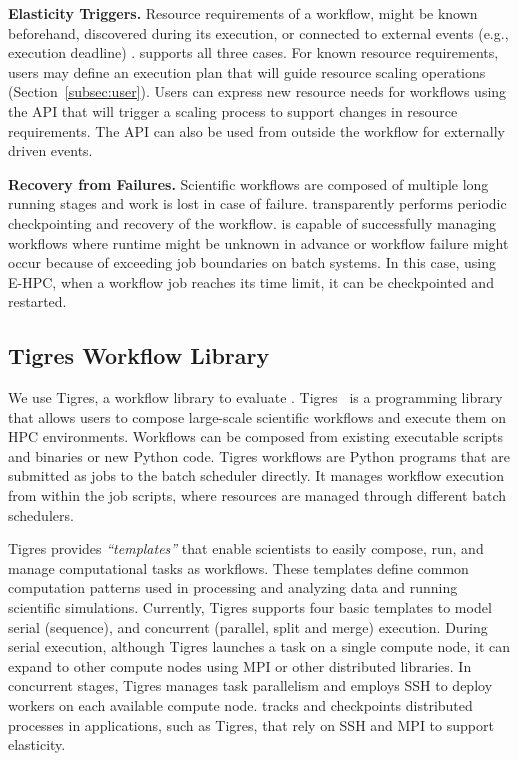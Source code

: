 \noindent \textbf{Elasticity Triggers.}  Resource requirements of a
workflow, might be known beforehand, discovered during its execution,
or connected to external events (e.g., execution deadline)
\cite{yu2005taxonomy}.  \systemname supports all three cases.  For
known resource requirements, users may define an execution plan that
will guide resource scaling operations (Section~\ref{subsec:user}).
Users can express new resource needs for workflows using the \systemname API that
will trigger a scaling process to support changes in resource
requirements. The API can also be used from outside the workflow for
externally driven events.

\noindent \textbf{Recovery from Failures.}
Scientific workflows are composed of multiple long running
stages and work is lost in case of failure.
\systemname transparently performs periodic checkpointing
and recovery of the workflow.
\systemname is capable of successfully
managing workflows where
runtime might be unknown in advance \cite{montage} or workflow 
failure might occur because of exceeding job boundaries on batch systems. 
In this case, using E-HPC, 
when a workflow job reaches its time limit,
 it can be checkpointed and restarted.

\vspace{-0.4cm}
\subsection{Tigres Workflow Library}

We use Tigres, a workflow library to evaluate \systemname.
Tigres~\cite{hendrix2016tigres} is a programming library that allows
users to compose large-scale scientific workflows and execute them on
HPC environments.  Workflows can be composed from existing executable
scripts and binaries or new Python code. Tigres workflows are Python
programs that are submitted as jobs to the batch scheduler
directly. It manages workflow execution from within the job scripts,
where resources are managed through different batch schedulers. 

Tigres provides \textit{``templates''} that enable scientists to
easily compose, run, and manage computational tasks as
workflows. These templates define common computation patterns used in
processing and analyzing data and running scientific
simulations. Currently, Tigres supports four basic templates to model
serial (sequence), and concurrent (parallel, split and merge)
execution.  During serial execution, although Tigres launches a task
on a single compute node, it can expand to other compute nodes using
MPI or other distributed libraries.  In concurrent stages, Tigres
manages task parallelism and employs SSH to deploy workers on each
available compute node.  \systemname tracks and checkpoints
distributed processes in applications, such as Tigres, that rely on
SSH and MPI to support elasticity.

